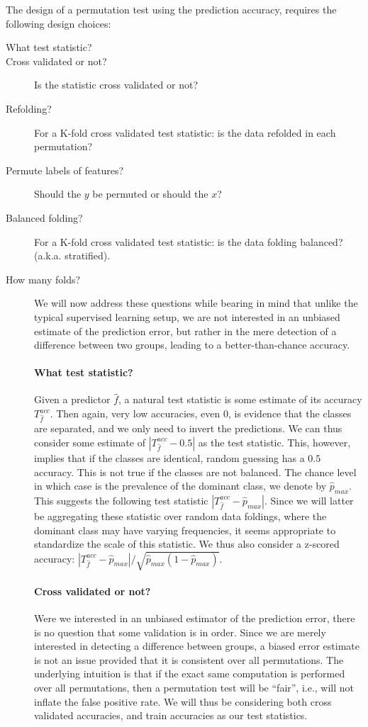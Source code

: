 \documentclass[12pt,a4paper]{article}
\newcommand{\features}{x} %
\newcommand{\outcomes}{y} %
\newcommand{\hyp}{f} %
\newcommand{\hypEstim}{\hat{\hyp}} %
\newcommand{\acc}{T^{acc}}
\newcommand{\dominant}{\hat{p}_{max}}
\begin{document}
The design of a permutation test using the prediction accuracy, requires the following design choices: 
\begin{description}
\item [What test statistic?] 
\item [Cross validated or not?] Is the statistic cross validated or not?
\item [Refolding?] For a K-fold cross validated test statistic: is the data refolded in each permutation? 
\item [Permute labels of features?] Should the $\outcomes$ be permuted or should the $\features$?
\item [Balanced folding?] For a K-fold cross validated test statistic: is the data folding balanced? (a.k.a. stratified).
\item [How many folds?] 

We will now address these questions while bearing in mind that unlike the typical supervised learning setup, we are not interested in an unbiased estimate of the prediction error, but rather in the mere detection of a difference between two groups, leading to a better-than-chance accuracy. 


\paragraph{What test statistic?}
Given a predictor $\hypEstim$, a natural test statistic is some estimate of its accuracy $\acc_{\hypEstim}$.
Then again, very low accuracies, even $0$, is evidence that the classes are separated, and we only need to invert the predictions. We can thus consider some estimate of $|\acc_{\hypEstim}-0.5|$ as the test statistic.
This, however, implies that if the classes are identical, random guessing has a $0.5$ accuracy. This is not true if the classes are not balanced. 
The chance level in which case is the prevalence of the dominant class, we denote by $\dominant$.
This suggests the following test statistic $|\acc_{\hypEstim}-\dominant|$.
Since we will latter be aggregating these statistic over random data foldings, where the dominant class may have varying frequencies, it seems appropriate to standardize the scale of this statistic. 
We thus also consider a z-scored accuracy: $|\acc_{\hypEstim}-\dominant|/\sqrt{\dominant(1-\dominant)}$.


\paragraph{Cross validated or not?}
Were we interested in an unbiased estimator of the prediction error, there is no question that some validation is in order. 
Since we are merely interested in detecting a difference between groups, a biased error estimate is not an issue provided that it is consistent over all permutations. 
The underlying intuition is that if the exact same computation is performed over all permutations, then a permutation test will be ``fair'', i.e., will not inflate the false positive rate. 
We will thus be considering both cross validated accuracies, and train accuracies as our test statistics. 



\end{description}
\end{document}
